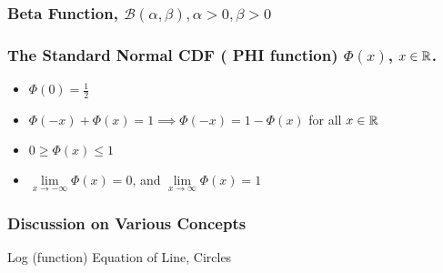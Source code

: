 \documentclass[compress]{beamer}
\begin{document}
\begin{frame}\frametitle{Beta Function, $\mathscr{B}(\alpha, \beta), \alpha>0, \beta>0$}
\begin{center}
 \vspace{.1in}
 
\end{center}
\vspace{2in}
\end{frame}








\begin{frame}\frametitle{The Standard Normal CDF ( PHI function)  $\Phi(x)$, $x\in \mathbb{R}$.}
\begin{center}
\begin{itemize}
 \item $\Phi(0)=\frac{1}{2}$
\item  $\Phi(-x)+\Phi(x)=1 \implies \Phi(-x)= 1- \Phi(x) $ for all $x\in \mathbb{R}$
 \item  $0 \geq \Phi(x) \leq 1$ 
  \item$\displaystyle \lim\limits_{x\rightarrow -\infty}\Phi(x)=0$, and  $\displaystyle \lim\limits_{x\rightarrow \infty}\Phi(x)=1$
 \end{itemize}
 \end{center}
\vspace{2in}
\end{frame}





\begin{frame}\frametitle{Discussion on Various Concepts}
{\tiny Log (function)
Equation of Line,  Circles 
}
\vspace{3in}
\end{frame}
\end{document}
